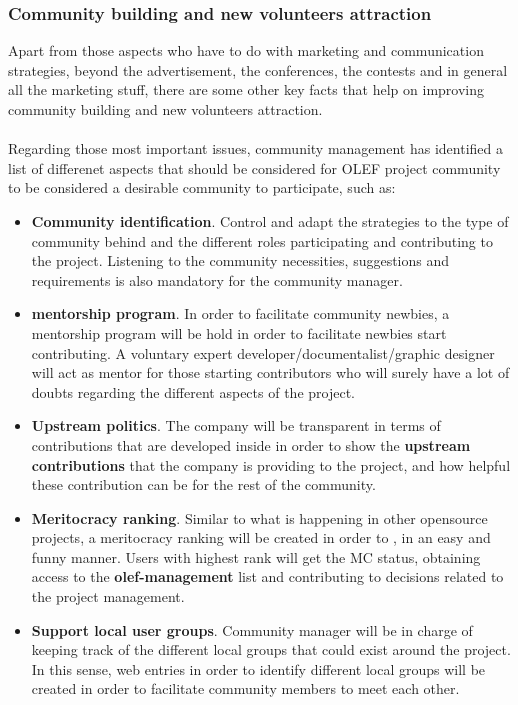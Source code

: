 \documentclass[11pt]{article}
\begin{document}
\subsubsection{Community building and new volunteers attraction}
Apart from those aspects who have to do with marketing and communication strategies, beyond the advertisement, the conferences, the contests and in general all the marketing stuff, there are some other key facts that help on improving community building and new volunteers attraction.\\
\\
Regarding those most important issues, community management has identified a list of differenet aspects that should be considered for OLEF project community to be considered a desirable community to participate, such as:
\begin{itemize}\itemsep0pt
\item{\textbf{Community identification}}. Control and adapt the strategies to the type of community behind and the different roles participating and contributing to the project. Listening to the community necessities, suggestions and requirements is also mandatory for the community manager.
\item{\textbf{mentorship program}}. In order to facilitate community newbies, a mentorship program will be hold in order to facilitate newbies start contributing. A voluntary expert developer/documentalist/graphic designer will act as mentor for those starting contributors who will surely have a lot of doubts regarding the different aspects of the project.
\item{\textbf{Upstream politics}}. The company will be transparent in terms of contributions that are developed inside in order to show the \textbf{upstream contributions} that the company is providing to the project, and how helpful these contribution can be for the rest of the community.
\item{\textbf{Meritocracy ranking}}. Similar to what is happening in other opensource projects, a meritocracy ranking will be created in order to , in an easy and funny manner. Users with highest rank will get the MC status, obtaining access to the \textbf{olef-management} list and contributing to decisions related to the project management.
\item{\textbf{Support local user groups}}. Community manager will be in charge of keeping track of the different local groups that could exist around the project. In this sense, web entries in order to identify different local groups will be created in order to facilitate community members to meet each other.

\end{itemize}
\end{document}
